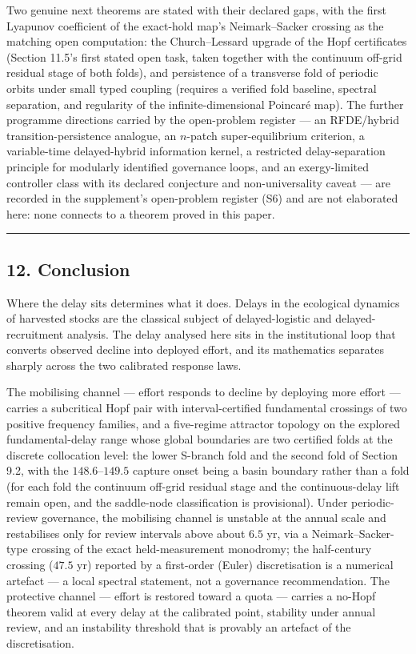 \documentclass[11pt]{article}
\begin{document}
Two genuine next theorems are stated with their declared gaps, with the
first Lyapunov coefficient of the exact-hold map's Neimark--Sacker
crossing as the matching open computation: the Church--Lessard upgrade
of the Hopf certificates (Section 11.5's first stated open task, taken
together with the continuum off-grid residual stage of both folds), and
persistence of a transverse fold of periodic orbits under small typed
coupling (requires a verified fold baseline, spectral separation, and
regularity of the infinite-dimensional Poincar\'e map). The further
programme directions carried by the open-problem register --- an
RFDE/hybrid transition-persistence analogue, an \(n\)-patch
super-equilibrium criterion, a variable-time delayed-hybrid information
kernel, a restricted delay-separation principle for modularly identified
governance loops, and an exergy-limited controller class with its
declared conjecture and non-universality caveat --- are recorded in the
supplement's open-problem register (S6) and are not elaborated here:
none connects to a theorem proved in this paper.

\begin{center}\rule{0.5\linewidth}{0.5pt}\end{center}

\subsection{12. Conclusion}\label{conclusion}

Where the delay sits determines what it does. Delays in the ecological
dynamics of harvested stocks are the classical subject of
delayed-logistic and delayed-recruitment analysis. The delay analysed
here sits in the institutional loop that converts observed decline into
deployed effort, and its mathematics separates sharply across the two
calibrated response laws.

The mobilising channel --- effort responds to decline by deploying more
effort --- carries a subcritical Hopf pair with interval-certified
fundamental crossings of two positive frequency families, and a
five-regime attractor topology on the explored fundamental-delay range
whose global boundaries are two certified folds at the discrete
collocation level: the lower S-branch fold and the second fold of
Section 9.2, with the \(148.6\)--\(149.5\) capture onset being a basin
boundary rather than a fold (for each fold the continuum off-grid
residual stage and the continuous-delay lift remain open, and the
saddle-node classification is provisional). Under periodic-review
governance, the mobilising channel is unstable at the annual scale and
restabilises only for review intervals above about \(6.5\) yr, via a
Neimark--Sacker-type crossing of the exact held-measurement monodromy;
the half-century crossing (\(47.5\) yr) reported by a first-order
(Euler) discretisation is a numerical artefact --- a local spectral
statement, not a governance recommendation. The protective channel ---
effort is restored toward a quota --- carries a no-Hopf theorem valid at
every delay at the calibrated point, stability under annual review, and
an instability threshold that is provably an artefact of the
discretisation.
\end{document}
